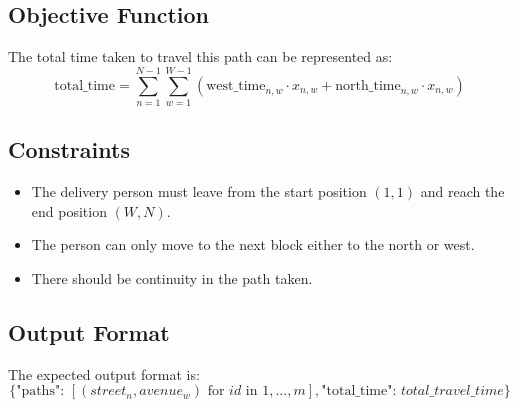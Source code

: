 \documentclass{article}
\begin{document}
\subsection*{Objective Function}
The total time taken to travel this path can be represented as:
\[
\text{total\_time} = \sum_{n=1}^{N-1} \sum_{w=1}^{W-1} (\text{west\_time}_{n,w} \cdot x_{n,w} + \text{north\_time}_{n,w} \cdot x_{n,w})
\]

\subsection*{Constraints}
\begin{itemize}
    \item The delivery person must leave from the start position \((1, 1)\) and reach the end position \((W, N)\).
    \item The person can only move to the next block either to the north or west.
    \item There should be continuity in the path taken.
\end{itemize}

\subsection*{Output Format}
The expected output format is:
\[
\{ 
    \text{"paths": } [(street_{n}, avenue_{w}) \text{ for } id \text{ in } 1, ..., m], 
    \text{"total\_time": } total\_travel\_time 
\}
\]
\end{document}
